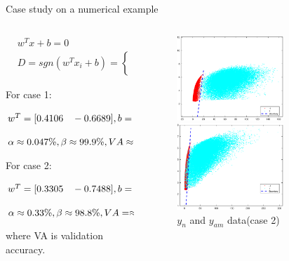 \documentclass[10pt]{beamer}
\begin{document}
\begin{frame}{Case study on a numerical example}
    \begin{columns}
             \begin{column}{0.5\textwidth}
 \begin{small}
\begin{equation} \nonumber
\begin{aligned}
& w^Tx+b=0  \\
& D=sgn(w^Tx_i+b) = \left\{ 
    \begin{aligned}
  & -1  \\
  &\quad 1 
  \end{aligned}
     \right.
\end{aligned}
\end{equation}
\end{small}
For case 1: \par  $\small{w^T = [ 0.4106 \quad -0.6689]
 , b = -3.473} $\par $\small{\alpha \approx 0.047\%,\beta  \approx  99.9\%,VA \approx 99.93\%}$ \par 
For case 2:  \par $\small{w^T = [0.3305 \quad -0.7488]
 , b = -0.8336} $\par $\small{\alpha \approx 0.33\%  ,\beta  \approx  98.8 \%,VA = \approx 89.83 \%}$ \par
 where VA is validation accuracy.
           \end{column}
        \begin{column}{0.5\textwidth} 
         \begin{figure}
        \centering
        \includegraphics[width=4cm]{fig/addHyper.eps}
        \caption{$y_n$ and $y_a$ data(case 1)}
        \includegraphics[width=4cm]{fig/ALhyperplane.eps}
        \caption{$y_n$ and $y_{am}$ data(case 2)}
        \end{figure}
        \end{column}
    \end{columns}
\end{frame}
\end{document}
